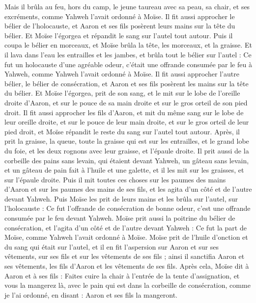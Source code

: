 \begin{multicols}{2}
Mais il brûla au feu, hors du camp, le jeune taureau avec sa peau, sa chair, et ses excréments, comme Yahweh l'avait ordonné à Moïse.
Il fit aussi approcher le bélier de l'holocauste, et Aaron et ses fils posèrent leurs mains sur la tête du bélier.
Et Moïse l'égorgea et répandit le sang sur l'autel tout autour.
Puis il coupa le bélier en morceaux, et Moïse brûla la tête, les morceaux, et la graisse.
Et il lava dans l'eau les entrailles et les jambes, et brûla tout le bélier sur l'autel : Ce fut un holocauste d'une agréable odeur, c'était une offrande consumée par le feu à Yahweh, comme Yahweh l'avait ordonné à Moïse.
Il fit aussi approcher l'autre bélier, le bélier de consécration, et Aaron et ses fils posèrent les mains sur la tête du bélier.
Et Moïse l'égorgea, prit de son sang, et le mit sur le lobe de l'oreille droite d'Aaron, et sur le pouce de sa main droite et sur le gros orteil de son pied droit.
Il fit aussi approcher les fils d'Aaron, et mit du même sang sur le lobe de leur oreille droite, et sur le pouce de leur main droite, et sur le gros orteil de leur pied droit, et Moïse répandit le reste du sang sur l'autel tout autour.
Après, il prit la graisse, la queue, toute la graisse qui est sur les entrailles, et le grand lobe du foie, et les deux rognons avec leur graisse, et l'épaule droite.
Il prit aussi de la corbeille des pains sans levain, qui étaient devant Yahweh, un gâteau sans levain, et un gâteau de pain fait à l'huile et une galette, et il les mit sur les graisses, et sur l'épaule droite.
Puis il mit toutes ces choses sur les paumes des mains d'Aaron et sur les paumes des mains de ses fils, et les agita d'un côté et de l'autre devant Yahweh.
Puis Moïse les prit de leurs mains et les brûla sur l'autel, sur l'holocauste : Ce fut l'offrande de consécration de bonne odeur, c'est une offrande consumée par le feu devant Yahweh.
Moïse prit aussi la poitrine du bélier de consécration, et l'agita d'un côté et de l'autre devant Yahweh : Ce fut la part de Moïse, comme Yahweh l'avait ordonné à Moïse.
Moïse prit de l'huile d'onction et du sang qui était sur l'autel, et il en fit l'aspersion sur Aaron et sur ses vêtements, sur ses fils et sur les vêtements de ses fils ; ainsi il sanctifia Aaron et ses vêtements, les fils d'Aaron et les vêtements de ses fils.
Après cela, Moïse dit à Aaron et à ses fils : Faites cuire la chair à l'entrée de la tente d'assignation, et vous la mangerez là, avec le pain qui est dans la corbeille de consécration, comme je l'ai ordonné, en disant : Aaron et ses fils la mangeront.

\end{multicols}
